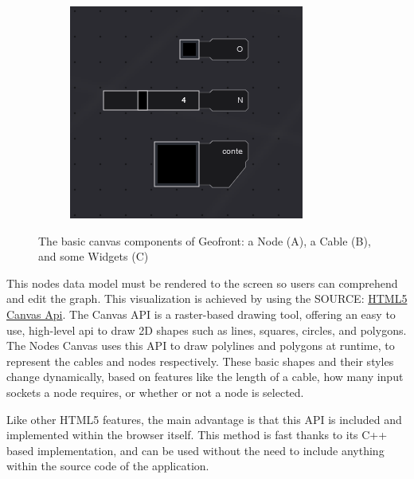 \begin{figure}
\begin{subfigure}[b]{0.30\linewidth}
    \graphicspath{ {../../assets/images/implementation/} }
    \centering
    \includegraphics[width=\linewidth]{widgets.png}
    \caption{}\label{fig:node-cable:3}
  \end{subfigure}%
  \caption[Nodes, Widgets and Cables]{The basic canvas components of Geofront: a Node (A), a Cable (B), and some Widgets (C) }
  \label{fig:node-cable}
\end{figure}

This nodes data model must be rendered to the screen so users can comprehend and edit the graph. 
This visualization is achieved by using the SOURCE: \href{https://developer.mozilla.org/en-US/docs/Web/API/Canvas_API}{HTML5 Canvas Api}. 
The Canvas API is a raster-based drawing tool, offering an easy to use, high-level api to draw 2D shapes such as lines, squares, circles, and polygons. 
The Nodes Canvas uses this API to draw polylines and polygons at runtime, to represent the cables and nodes respectively. 
These basic shapes and their styles change dynamically, based on features like the length of a cable, how many input sockets a node requires, or whether or not a node is selected. 

Like other HTML5 features, the main advantage is that this API is included and implemented within the browser itself. This method is fast thanks to its C++ based implementation, and can be used without the need to include anything within the source code of the application.


